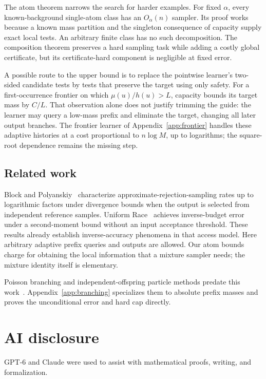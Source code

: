 \documentclass[11pt]{article}
\theoremstyle{definition}\newtheorem{definition}[theorem]{Definition}
\theoremstyle{remark}\newtheorem{remark}[theorem]{Remark}
\begin{document}
The atom theorem narrows the search for harder examples. For fixed $\alpha$, every known-background single-atom class has an $O_\alpha(n)$ sampler. Its proof works because a known mass partition and the singleton consequence of capacity supply exact local tests. An arbitrary finite class has no such decomposition. The composition theorem preserves a hard sampling task while adding a costly global certificate, but its certificate-hard component is negligible at fixed error.

A possible route to the upper bound is to replace the pointwise learner's two-sided candidate tests by tests that preserve the target using only safety. For a first-occurrence frontier on which $\mu(u)/h(u)>L$, capacity bounds its target mass by $C/L$. That observation alone does not justify trimming the guide: the learner may query a low-mass prefix and eliminate the target, changing all later output branches. The frontier learner of Appendix~\ref{app:frontier} handles these adaptive histories at a cost proportional to $n\log M$, up to logarithms; the square-root dependence remains the missing step.

\subsection{Related work}
Block and Polyanskiy~\cite[Theorems 3 and 5]{bp} characterize approximate-rejection-sampling rates up to logarithmic factors under divergence bounds when the output is selected from independent reference samples. Uniform Race~\cite[Corollary 1 and Appendix D]{ur} achieves inverse-budget error under a second-moment bound without an input acceptance threshold. These results already establish inverse-accuracy phenomena in that access model. Here arbitrary adaptive prefix queries and outputs are allowed. Our atom bounds charge for obtaining the local information that a mixture sampler needs; the mixture identity itself is elementary.

Poisson branching and independent-offspring particle methods predate this work~\cite{poisson,rrr}. Appendix~\ref{app:branching} specializes them to absolute prefix masses and proves the unconditional error and hard cap directly.

\section*{AI disclosure}
GPT-6 and Claude were used to assist with mathematical proofs, writing, and formalization.
\end{document}
